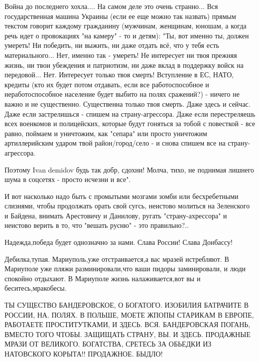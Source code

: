 Война до последнего хохла....
На самом деле это очень странно... 
Вся государственная машина Украины (если ее еще можно так назвать) прямым текстом говорит каждому гражданину (мужчинам, женщинам, юношам, а когда речь идет о провокациях "на камеру" - то и детям): 
"Ты, вот именно ты, должен умереть! Ни победить, ни выжить, ни даже отдать всё, что у тебя есть материального... 
Нет, именно так - умереть! Не интересует ни твоя прежняя жизнь, ни твои убеждения и патриотизм, ни даже вклад в поддержку войск на передовой... Нет. 
Интересует только твоя смерть! 
Вступление в ЕС, НАТО, кредиты (кто их будет потом отдавать, если все работоспособное и неработоспособное население будет выбито на полях сражений?) - ничего не важно и не существенно. 
Существенна только твоя смерть. Даже здесь и сейчас. Даже если застрелишься - спишем на страну-агрессора. Даже если перестреляешь всех военкомов и полицейских, которые будут гоняться за тобой с повесткой - все равно, поймаем и уничтожим, как "сепара" или просто уничтожим артиллерийским ударом твой район/город/село - и снова спишем все на страну-агрессора.

Поэтому Ivan demidov будь так добр, сдохни!
Молча, тихо, не поднимая лишнего шума в соцсетях - просто исчезни и все".

И вот насколько надо быть с промытыми мозгами зомби или бесхребетными слизнями, чтобы продолжать орать свой сугсь, неистово молиться на Зеленского и Байдена, внимать Арестовичу и Данилову, ругать "страну-ахрессора" и неистово верить в то, что "вешать русню" - это правильно?..

Надежда,победа будет однозначно за нами. Слава России! Слава Донбассу!


Дебилка,тупая. Мариуполь,уже отстраивается,а вас мразей истребляют. В Мариуполе
уже пляжи разминировали,что ваши пидоры заминировали, и люди спокойно отдыхают.
В Мариуполе жизнь налаживается,вот вы и беситесь,мракобесы.


ТЫ СУЩЕСТВО БАНДЕРОВСКОЕ, О БОГАТОГО. ИЗОБИЛИЯ БАТРАЧИТЕ В РОССИИ, НА. ПОЛЯХ. В
ПОЛЬШЕ, МОЕТЕ ЖПОПЫ СТАРИКАМ В ЕВРОПЕ, РАБОТАЕТЕ ПРОСТИТУТКАМИ, И ЗДЕСЬ. ВСЯ.
БАНДЕРОВСКАЯ ПОГАНЬ, ВМЕСТО ТОГО ЧТОБЫ. ЗАЩИЩАТЬ СТРАНУ, ВЫ. И ЗДЕСЬ. ПРОДАЖНЫЕ
МРАЗИ ОТ ВЕЛИКОГО. БОГАТСТВА, СРЕТЕСЬ ЗА ОБЬЕДКИ ИЗ НАТОВСКОГО КОРЫТА!!
ПРОДАЖНОЕ. БЫДЛО!

